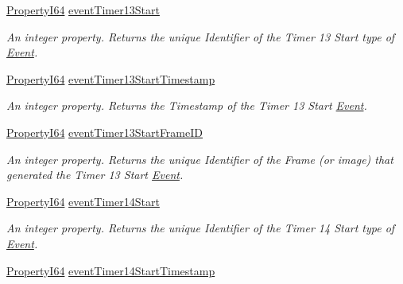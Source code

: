\begin{DoxyCompactItemize}
\hyperlink{group___common_interface_ga81749b2696755513663492664a18a893}{Property\+I64} \hyperlink{classmv_i_m_p_a_c_t_1_1acquire_1_1_gen_i_cam_1_1_event_control_ac93d6d4734cb5d048709912c506b7dbf}{event\+Timer13\+Start}
\begin{DoxyCompactList}\small\item\em An integer property. Returns the unique Identifier of the Timer 13 Start type of \hyperlink{classmv_i_m_p_a_c_t_1_1acquire_1_1_event}{Event}. \end{DoxyCompactList}\item 
\hyperlink{group___common_interface_ga81749b2696755513663492664a18a893}{Property\+I64} \hyperlink{classmv_i_m_p_a_c_t_1_1acquire_1_1_gen_i_cam_1_1_event_control_aba0c798f01b1285d20626a224fcb0130}{event\+Timer13\+Start\+Timestamp}
\begin{DoxyCompactList}\small\item\em An integer property. Returns the Timestamp of the Timer 13 Start \hyperlink{classmv_i_m_p_a_c_t_1_1acquire_1_1_event}{Event}. \end{DoxyCompactList}\item 
\hyperlink{group___common_interface_ga81749b2696755513663492664a18a893}{Property\+I64} \hyperlink{classmv_i_m_p_a_c_t_1_1acquire_1_1_gen_i_cam_1_1_event_control_af5333d33d2d9b8130c7e4ce393c12d8e}{event\+Timer13\+Start\+Frame\+I\+D}
\begin{DoxyCompactList}\small\item\em An integer property. Returns the unique Identifier of the Frame (or image) that generated the Timer 13 Start \hyperlink{classmv_i_m_p_a_c_t_1_1acquire_1_1_event}{Event}. \end{DoxyCompactList}\item 
\hyperlink{group___common_interface_ga81749b2696755513663492664a18a893}{Property\+I64} \hyperlink{classmv_i_m_p_a_c_t_1_1acquire_1_1_gen_i_cam_1_1_event_control_a7605be827fe6c1e4519132883fae639c}{event\+Timer14\+Start}
\begin{DoxyCompactList}\small\item\em An integer property. Returns the unique Identifier of the Timer 14 Start type of \hyperlink{classmv_i_m_p_a_c_t_1_1acquire_1_1_event}{Event}. \end{DoxyCompactList}\item 
\hyperlink{group___common_interface_ga81749b2696755513663492664a18a893}{Property\+I64} \hyperlink{classmv_i_m_p_a_c_t_1_1acquire_1_1_gen_i_cam_1_1_event_control_af223329a5896ceebd19546f852e5bc23}{event\+Timer14\+Start\+Timestamp}

\end{DoxyCompactItemize}
